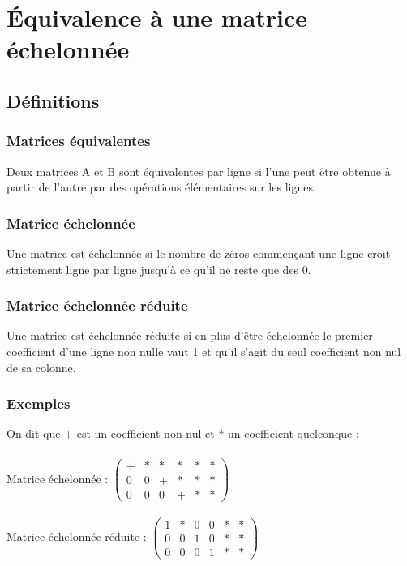 \documentclass[a4paper,10pt]{book} %
\begin{document}
\section{Équivalence à une matrice échelonnée}
\subsection{Définitions}
\subsubsection{Matrices équivalentes}
Deux matrices A et B sont équivalentes par ligne si l'une peut être obtenue à partir de l'autre par des opérations élémentaires sur les lignes.

\subsubsection{Matrice échelonnée}
Une matrice est échelonnée si le nombre de zéros commençant une ligne croit strictement ligne par ligne jusqu'à ce qu'il ne reste que des 0.

\subsubsection{Matrice échelonnée réduite}
Une matrice est échelonnée réduite si en plus d'être échelonnée le premier coefficient d'une ligne non nulle vaut 1 et qu'il s'agit du seul coefficient non nul de sa colonne.

\subsubsection{Exemples}
On dit que + est un coefficient non nul et * un coefficient quelconque :\\\\

Matrice échelonnée : $\begin{pmatrix}
+ & * & * & * & * & * \\
0 & 0 & + & * & * & * \\
0 & 0 & 0 & + & * & *
\end{pmatrix}$\\\\

Matrice échelonnée réduite : $\begin{pmatrix}
1 & * & 0 & 0 & * & * \\
0 & 0 & 1 & 0 & * & * \\
0 & 0 & 0 & 1 & * & *
\end{pmatrix}$
\end{document}
